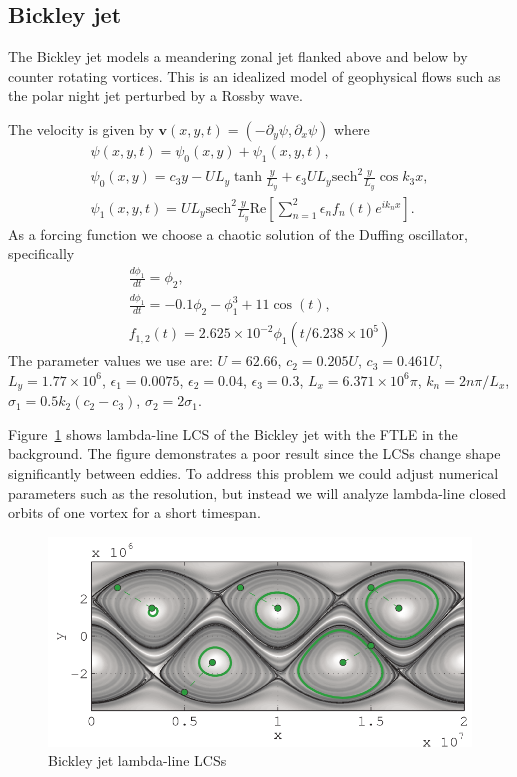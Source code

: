 \documentclass{article}
\begin{document}
\clearpage

\subsection{Bickley jet}

The Bickley jet models a meandering zonal jet flanked above and below by
counter rotating vortices. This is an idealized model of geophysical flows
such as the polar night jet perturbed by a Rossby
wave\parencite{haller12:_geodes_theor_trans_barrier_two_dimen_flows,beron-vera10:_invar_lagran}.

The velocity is given by $\boldsymbol{v}(x,y,t) = (-\partial_y \psi, \partial_x \psi)$ where
\begin{gather*}
\psi(x,y,t) = \psi_0(x,y) + \psi_1(x,y,t),\\
\psi_0(x,y) = c_3 y - U L_y \tanh\frac{y}{L_y} + \epsilon_3 U L_y \mathrm{sech}^2\frac{y}{L_y} \cos k_3 x,\\
\psi_1(x,y,t) = U L_y \mathrm{sech}^2\frac{y}{L_y} \mathrm{Re}\left[ \sum_{n=1}^2 \epsilon_n f_n(t) e^{i k_n x}\right].
\end{gather*}
As a forcing function we choose a chaotic solution of the Duffing oscillator, specifically
\begin{gather*}
\frac{d \phi_1}{dt} = \phi_2,\\
\frac{d \phi_1}{dt} = -0.1 \phi_2 - \phi_1^3 + 11 \cos(t),\\
f_{1,2}(t) = 2.625 \times 10^{-2} \phi_1(t/6.238 \times 10^5)
\end{gather*}
The parameter values we use are: $U = 62.66$, $c_2 = 0.205 U$, $c_3 = 0.461 U$, $L_y = 1.77 \times 10^6$, $\epsilon_1 = 0.0075$, $\epsilon_2 = 0.04$, $\epsilon_3 = 0.3$, $L_x = 6.371 \times 10^6 \pi$, $k_n = 2 n \pi/L_x$, $\sigma_1 = 0.5 k_2 (c_2 - c_3)$, $\sigma_2 = 2 \sigma_1$.

Figure~\ref{fig:Bickley_jet_lambda_LCS_full} shows lambda-line LCS of the Bickley jet with the FTLE in the background. The figure demonstrates a poor result since the LCSs change shape significantly between eddies. To address this problem we could adjust numerical parameters such as the resolution, but instead we will analyze lambda-line closed orbits of one vortex for a short timespan.

\begin{figure}
  \centering
  \includegraphics[width=.85\textwidth]{graphics/bickley_jet/lambda_lcs_full}
  \caption{Bickley jet lambda-line LCSs}
  \label{fig:Bickley_jet_lambda_LCS_full}
\end{figure}
\end{document}
